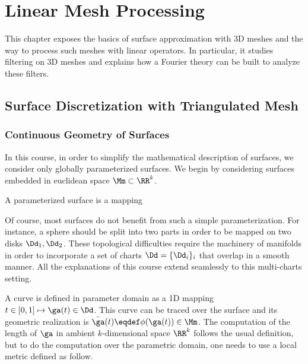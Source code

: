\chapter{Linear Mesh Processing}
\label{chap-meshes}

This chapter exposes the basics of surface approximation with 3D meshes and the way to process such meshes with linear operators. In particular, it studies filtering on 3D meshes and explains how a Fourier theory can be built to analyze these filters. 

\section{Surface Discretization with Triangulated Mesh}

\subsection{Continuous Geometry of Surfaces}

In this course, in order to simplify the mathematical description of surfaces, we consider only globally parameterized surfaces. We begin by considering surfaces embedded in euclidean space $\Mm \subset \RR^k$.

\begin{defn} \label{defn-param-surface}A parameterized surface is a mapping
\end{defn}

Of course, most surfaces do not benefit from such a simple parameterization. For instance, a sphere should be split into two parts in order to be mapped on two disks $\Dd_1,\Dd_2$. These topological difficulties require the machinery of manifolds in order to incorporate a set of charts $\Dd = \{\Dd_i\}_i$ that overlap in a smooth manner. All the explanations of this course extend seamlessly to this multi-charts setting.

A curve is defined in parameter domain as a 1D mapping $t \in [0,1] \mapsto \ga(t) \in \Dd$. This curve can be traced over the surface and its geometric realization is $\bar \ga(t) \eqdef \phi(\ga(t)) \in \Mm$. The computation of the length of $\ga$ in ambient $k$-dimensional space $\RR^k$ follows the usual definition, but to do the computation over the parametric domain, one needs to use a local metric defined as follow. 

